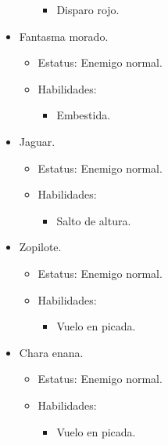\begin{itemize}
\begin{itemize}
					\begin{itemize}
						\item Disparo rojo.			
					\end{itemize}
			\end{itemize}
		\item Fantasma morado.
			\begin{itemize}
				\item Estatus: Enemigo normal. 
				\item Habilidades: 
					\begin{itemize}
						\item Embestida.			
					\end{itemize}
			\end{itemize}
		\item Jaguar.
			\begin{itemize}
				\item Estatus: Enemigo normal. 
				\item Habilidades: 
					\begin{itemize}
						\item Salto de altura.			
					\end{itemize}
			\end{itemize}
		\item Zopilote.
			\begin{itemize}
				\item Estatus: Enemigo normal. 
				\item Habilidades: 
					\begin{itemize}
						\item Vuelo en picada.			
					\end{itemize}
			\end{itemize}
		\item Chara enana.
			\begin{itemize}
				\item Estatus: Enemigo normal. 
				\item Habilidades: 
					\begin{itemize}
						\item Vuelo en picada.			
					\end{itemize}
			\end{itemize}
	\end{itemize}